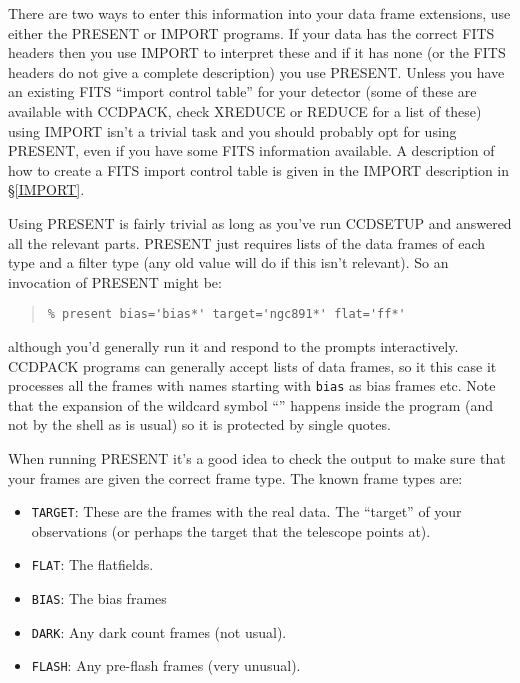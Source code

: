 \documentclass[twoside,11pt]{article}
\newcommand{\hyperref}[4]{#2\ref{#4}#3}
\newcommand{\htmlref}[2]{#1}
\newcommand{\latexhtml}[2]{#1}
\renewcommand{\_}{\texttt{\symbol{95}}}
\newcommand{\ttsize}{\latexhtml{\small}{}}
\newenvironment{myquote}{\begin{quote}\ttsize}{\end{quote}}
\newcommand{\text}[1]{{\ttsize \tt #1}}
\newcommand{\routine}[1]{{\sc #1}}
\newcommand{\xroutine}[1]{\htmlref{{\sc #1}}{#1}}
\begin{document}
There are two ways to enter this information into your data frame
extensions, use either the \xroutine{PRESENT} or \xroutine{IMPORT} programs.
If your data has the correct FITS headers then you use \routine{IMPORT}
to interpret these and if it has none (or the FITS headers do not
give a complete description) you use \routine{PRESENT}. Unless you have
an existing FITS ``import control table'' for your detector (some of these
are available with CCDPACK, check \xroutine{XREDUCE} or \xroutine{REDUCE}
 for a list of these) using \routine{IMPORT}
isn't a trivial task and you should probably opt for using
\routine{PRESENT}, even if you have some FITS information available.
A description of how to create a FITS import control table is given in
the \routine{IMPORT} \hyperref{description}{description in \S}{}{IMPORT}.

Using \routine{PRESENT} is fairly trivial as long as you've
run \routine{CCDSETUP} and answered all the relevant parts.
\routine{PRESENT} just requires lists of the
data frames of each type and a filter type (any old value will do if this
isn't relevant). So an invocation of \routine{PRESENT} might be:
\begin{myquote}
\begin{verbatim}
% present bias='bias*' target='ngc891*' flat='ff*'
\end{verbatim}
\end{myquote}
although you'd generally run it and respond to the prompts
interactively. CCDPACK programs can generally accept lists of data
frames, so it this case it processes all the frames with names
starting with \text{bias} as bias frames etc. Note that the
expansion of the wildcard symbol ``\text{*}'' happens inside the program
(and not by the shell as is usual) so it is protected by single quotes.

When running \routine{PRESENT} it's a good idea to check the output to
make sure that your frames are given the correct frame type. The known frame
types are:
\begin{itemize}
\item \text{TARGET}: These are the frames with the real data. The
``target'' of your observations (or perhaps the target that the
telescope points at).
\item \text{FLAT}: The flatfields.
\item \text{BIAS}: The bias frames
\item \text{DARK}: Any dark count frames (not usual).
\item \text{FLASH}: Any pre-flash frames (very unusual).
\end{itemize}
\end{document}
